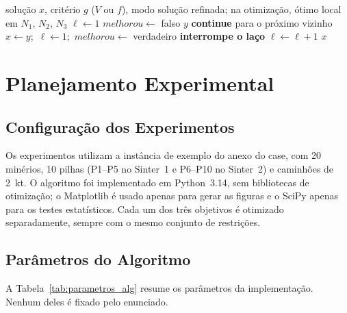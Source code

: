 \documentclass[conference]{IEEEtran}
\begin{document}
\begin{algorithm}[!t]
\caption{Busca local VND}
\label{alg:vnd}
\begin{algorithmic}[1]
\Require solução $x$, critério $g$ ($V$ ou $f$), modo
\Ensure solução refinada; na otimização, ótimo local em $N_1$, $N_2$, $N_3$
\State $\ell \gets 1$
    \State $melhorou \gets$ falso
            \State \Return $y$
        \EndIf
            \State \textbf{continue} para o próximo vizinho
        \EndIf
            \State $x \gets y$;\ $\ell \gets 1$;\ $melhorou \gets$ verdadeiro
            \State \textbf{interrompe o laço}
        \EndIf
    \EndFor
     \State $\ell \gets \ell + 1$ \EndIf
\EndWhile
\State \Return $x$
\end{algorithmic}
\end{algorithm}

\section{Planejamento Experimental}\label{sec:planejamento}

\subsection{Configuração dos Experimentos}

Os experimentos utilizam a instância de exemplo do anexo do case, com 20 minérios, 10 pilhas (P1--P5 no Sinter~1 e P6--P10 no Sinter~2) e caminhões de 2~kt. O algoritmo foi implementado em Python~3.14, sem bibliotecas de otimização; o Matplotlib é usado apenas para gerar as figuras e o SciPy apenas para os testes estatísticos. Cada um dos três objetivos é otimizado separadamente, sempre com o mesmo conjunto de restrições.

\subsection{Parâmetros do Algoritmo}

A Tabela~\ref{tab:parametros_alg} resume os parâmetros da implementação. Nenhum deles é fixado pelo enunciado.
\end{document}

